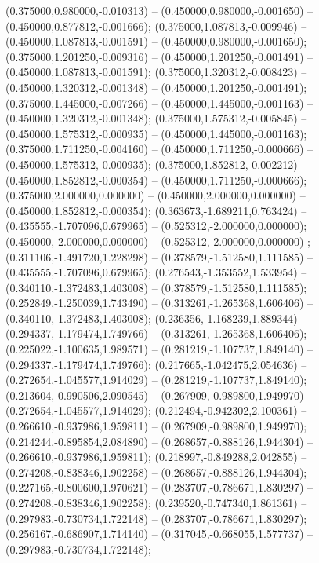  (0.375000,0.980000,-0.010313) -- (0.450000,0.980000,-0.001650) -- (0.450000,0.877812,-0.001666);
 (0.375000,1.087813,-0.009946) -- (0.450000,1.087813,-0.001591) -- (0.450000,0.980000,-0.001650);
 (0.375000,1.201250,-0.009316) -- (0.450000,1.201250,-0.001491) -- (0.450000,1.087813,-0.001591);
 (0.375000,1.320312,-0.008423) -- (0.450000,1.320312,-0.001348) -- (0.450000,1.201250,-0.001491);
 (0.375000,1.445000,-0.007266) -- (0.450000,1.445000,-0.001163) -- (0.450000,1.320312,-0.001348);
 (0.375000,1.575312,-0.005845) -- (0.450000,1.575312,-0.000935) -- (0.450000,1.445000,-0.001163);
 (0.375000,1.711250,-0.004160) -- (0.450000,1.711250,-0.000666) -- (0.450000,1.575312,-0.000935);
 (0.375000,1.852812,-0.002212) -- (0.450000,1.852812,-0.000354) -- (0.450000,1.711250,-0.000666);
 (0.375000,2.000000,0.000000) -- (0.450000,2.000000,0.000000) -- (0.450000,1.852812,-0.000354);
 (0.363673,-1.689211,0.763424) -- (0.435555,-1.707096,0.679965) -- (0.525312,-2.000000,0.000000);
 (0.450000,-2.000000,0.000000) -- (0.525312,-2.000000,0.000000) ;
 (0.311106,-1.491720,1.228298) -- (0.378579,-1.512580,1.111585) -- (0.435555,-1.707096,0.679965);
 (0.276543,-1.353552,1.533954) -- (0.340110,-1.372483,1.403008) -- (0.378579,-1.512580,1.111585);
 (0.252849,-1.250039,1.743490) -- (0.313261,-1.265368,1.606406) -- (0.340110,-1.372483,1.403008);
 (0.236356,-1.168239,1.889344) -- (0.294337,-1.179474,1.749766) -- (0.313261,-1.265368,1.606406);
 (0.225022,-1.100635,1.989571) -- (0.281219,-1.107737,1.849140) -- (0.294337,-1.179474,1.749766);
 (0.217665,-1.042475,2.054636) -- (0.272654,-1.045577,1.914029) -- (0.281219,-1.107737,1.849140);
 (0.213604,-0.990506,2.090545) -- (0.267909,-0.989800,1.949970) -- (0.272654,-1.045577,1.914029);
 (0.212494,-0.942302,2.100361) -- (0.266610,-0.937986,1.959811) -- (0.267909,-0.989800,1.949970);
 (0.214244,-0.895854,2.084890) -- (0.268657,-0.888126,1.944304) -- (0.266610,-0.937986,1.959811);
 (0.218997,-0.849288,2.042855) -- (0.274208,-0.838346,1.902258) -- (0.268657,-0.888126,1.944304);
 (0.227165,-0.800600,1.970621) -- (0.283707,-0.786671,1.830297) -- (0.274208,-0.838346,1.902258);
 (0.239520,-0.747340,1.861361) -- (0.297983,-0.730734,1.722148) -- (0.283707,-0.786671,1.830297);
 (0.256167,-0.686907,1.714140) -- (0.317045,-0.668055,1.577737) -- (0.297983,-0.730734,1.722148);
